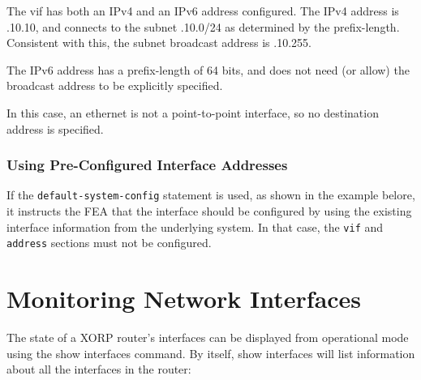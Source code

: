 The vif has both an IPv4 and an IPv6 address configured.  The IPv4
address is {.10.10}, and connects to the subnet {.10.0/24} as determined by the prefix-length.  Consistent with
this, the subnet broadcast address is {.10.255}.

The IPv6 address has a prefix-length of 64 bits, and does not need (or
allow) the broadcast address to be explicitly specified.  

In this case, an ethernet is not a point-to-point interface, so no
destination address is specified.


\subsubsection{Using Pre-Configured Interface Addresses}

If the {\tt default-system-config} statement is used, as shown in the
example belore, it instructs the FEA that the interface should be
configured by using the existing interface information from the
underlying system.  In that case, the {\tt vif} and {\tt address}
sections must not be configured.

\vspace{0.1in}
\noindent{}
\vspace{0.1in}


\newpage
\section{Monitoring Network Interfaces}

The state of a XORP router's interfaces can be displayed from
operational mode using the {\stt show interfaces} command.  By itself,
{\stt show interfaces} will list information about all the interfaces
in the router:

